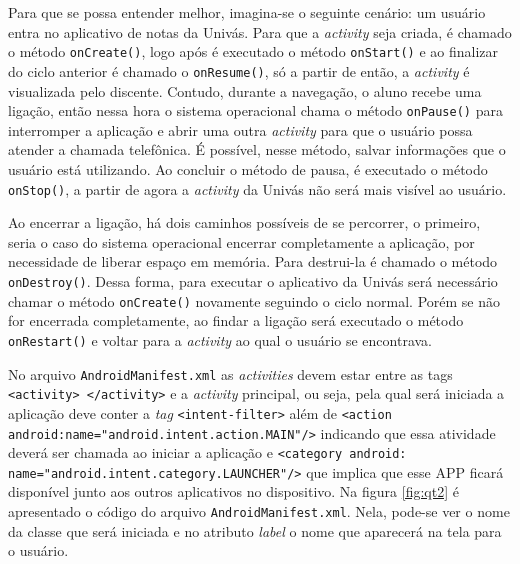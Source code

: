 	\par Para que se possa entender melhor, imagina-se o seguinte cenário: um
usuário entra no aplicativo de notas da Univás. Para que a \textit{activity}
seja criada, é chamado o método \texttt{onCreate()}, logo após é executado o
método \texttt{onStart()} e ao finalizar do ciclo anterior é chamado o
\texttt{onResume()}, só a partir de então, a \textit{activity} é visualizada
pelo discente. Contudo, durante a navegação, o aluno recebe uma ligação, então
nessa hora o sistema operacional chama o método \texttt{onPause()} para
interromper a aplicação e abrir uma outra \textit{activity} para que o usuário
possa atender a chamada telefônica. É possível, nesse método, salvar
informações que o usuário está utilizando. Ao concluir o método de pausa, é
executado o método \texttt{onStop()}, a partir de agora a \textit{activity} da
Univás não será mais visível ao usuário.

 	\par Ao encerrar a ligação, há dois caminhos possíveis de se percorrer, o
primeiro, seria o caso do sistema operacional encerrar completamente a
aplicação, por necessidade de liberar espaço em memória. Para destrui-la é
chamado o método \texttt{onDestroy()}. Dessa forma, para executar o aplicativo
da Univás será necessário chamar o método \texttt{onCreate()} novamente
seguindo o ciclo normal. Porém se não for encerrada completamente, ao findar a
ligação será executado o método \texttt{onRestart()} e voltar para a
\textit{activity} ao qual o usuário se encontrava.

	\par No arquivo \texttt{AndroidManifest.xml} as \textit{activities} devem estar
entre as tags \texttt{<activity> </activity>} e a \textit{activity} principal,
ou seja, pela qual será iniciada a aplicação deve conter a \textit{tag}
\texttt{<intent-filter>} além de \texttt{<action
android:name="android.intent.action.MAIN"/>} indicando que essa atividade
deverá ser chamada ao iniciar a aplicação e \texttt{<category
android:\\name="android.intent.category.LAUNCHER"/>} que implica que esse
APP ficará disponível junto aos outros aplicativos no dispositivo.
Na figura \ref{fig:qt2} é apresentado o código do arquivo
\texttt{AndroidManifest.xml}. Nela, pode-se ver o nome da classe que será
iniciada e no atributo \textit{label} o nome que aparecerá na tela para o
usuário.
	
